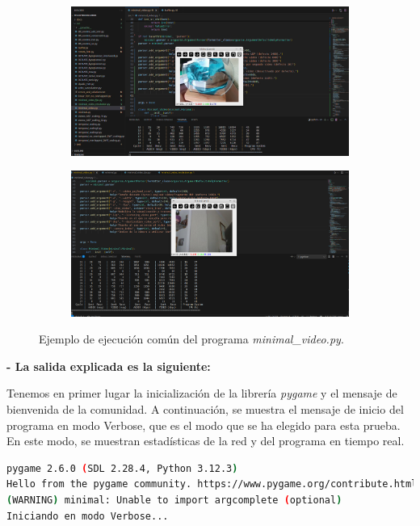\begin{figure}[htbp]
    \centering
    \begin{subfigure}{0.6\textwidth}
        \centering
        \includegraphics[width=\textwidth]{images/pruebas/ejecuion_normal1.png}
    \end{subfigure}
    \hfill
    \begin{subfigure}{0.6\textwidth}
        \centering
        \includegraphics[width=\textwidth]{images/pruebas/ejecuion_normal2.png}
    \end{subfigure}
    \caption{Ejemplo de ejecución común del programa \textit{minimal\_video.py}.}
    \label{fig:ejecucion_doble}
\end{figure}
\vspace{\baselineskip}
\newpage

\textbf{- La salida explicada es la siguiente:}
\vspace{\baselineskip}

Tenemos en primer lugar la inicialización de la librería \textit{pygame} y el mensaje de bienvenida de la comunidad. A continuación, se muestra el mensaje de inicio del programa en modo Verbose, que es el modo que se ha elegido para esta prueba. En este modo, se muestran estadísticas de la red y del programa en tiempo real.
\begin{lstlisting}[language=bash,basicstyle=\ttfamily\scriptsize]
pygame 2.6.0 (SDL 2.28.4, Python 3.12.3)
Hello from the pygame community. https://www.pygame.org/contribute.html
(WARNING) minimal: Unable to import argcomplete (optional)
Iniciando en modo Verbose...
\end{lstlisting}


